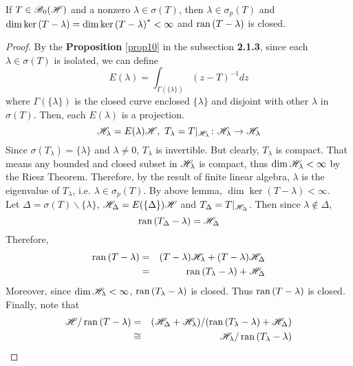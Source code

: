 \begin{thm} \label{thm12}
	If $T \in \mathscr{B}_{0}\mathscr{(H)}$ and a nonzero $\lambda \in \sigma(T)$, then $\lambda \in \sigma_p(T)$ and $\dim{\ker{(T-\lambda)}} = \dim{\ker{(T-\lambda)}^{*}} < \infty$ and $\operatorname{ran}{(T-\lambda)}$ is closed.
\end{thm}
\begin{proof}
	By the \textbf{Proposition} \ref{prop10} in the subsection \textbf{2.1.3}, since each $\lambda \in \sigma(T)$ is isolated, we can define
	\begin{equation*}
		E(\lambda) = \int_{\Gamma(\{\lambda\})} (z-T)^{-1} dz 
	\end{equation*}
	where $\Gamma(\{\lambda\})$ is the closed curve enclosed $\{\lambda\}$ and disjoint with other $\lambda$ in $\sigma(T)$. Then, each $E(\lambda)$ is a projection.
	\begin{equation*}
		\mathscr{H}_{\lambda} = E(\lambda)\mathscr{H},~ T_{\lambda} = T|_{\mathscr{H}_{\lambda}} \colon \mathscr{H}_{\lambda} \rightarrow \mathscr{H}_{\lambda}
	\end{equation*}
	Since $\sigma(T_{\lambda}) = \{\lambda\}$ and $\lambda \neq 0$, $T_{\lambda}$ is invertible. But clearly, $T_{\lambda}$ is compact. That means any bounded and closed subset in $\mathscr{H}_{\lambda}$ is compact, thus $\dim{\mathscr{H}_{\lambda}} < \infty$ by the Riesz Theorem. Therefore, by the result of finite linear algebra, $\lambda$ is the eigenvalue of $T_{\lambda}$, i.e. $\lambda \in \sigma_p(T)$. By above lemma, $\dim{\ker{(T-\lambda)}} < \infty$.\\
	Let $\Delta = \sigma(T) \backslash \{\lambda\}$, $\mathscr{H}_{\Delta} = E(\{\Delta\})\mathscr{H}$ and $T_{\Delta} = T|_{\mathscr{H}_{\Delta}}$. Then since $\lambda \notin \Delta$,
	\begin{equation*}
		\operatorname{ran}{(T_{\Delta}-\lambda)} = \mathscr{H}_{\Delta}
	\end{equation*}
	Therefore, 
	\begin{eqnarray*}
		\operatorname{ran}{(T-\lambda)} &=& (T-\lambda)\mathscr{H}_{\lambda}+(T-\lambda)\mathscr{H}_{\Delta} \\
		&=& \operatorname{ran}{(T_{\lambda}-\lambda)} + \mathscr{H}_{\Delta}
	\end{eqnarray*}
	Moreover, since $\dim{\mathscr{H}_{\lambda}} < \infty$, $\operatorname{ran}{(T_{\lambda}-\lambda)}$ is closed. Thus $\operatorname{ran}{(T-\lambda)}$ is closed.\\
	Finally, note that
	\begin{eqnarray*}
		\Hs / \ran{(T-\lambda)} &=& (\Hs_{\Delta} + \Hs_{\lambda}) / (\ran{(T_{\lambda}-\lambda)} + \Hs_{\Delta}) \\
		&\cong& \Hs_{\lambda} / \ran{(T_{\lambda}-\lambda)}

\end{eqnarray*}
\end{proof}

